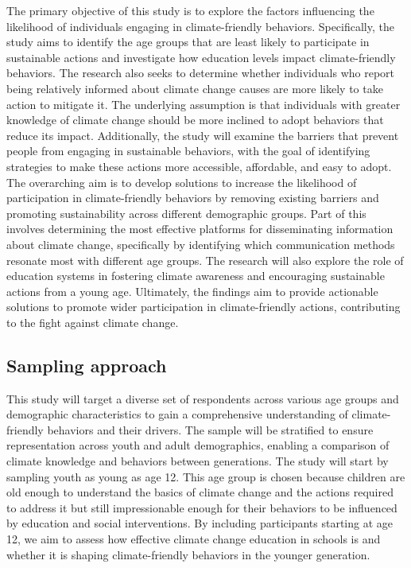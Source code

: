 \documentclass[
  letterpaper,
  DIV=11,
  numbers=noendperiod]{scrartcl}
\begin{document}
The primary objective of this study is to explore the factors
influencing the likelihood of individuals engaging in climate-friendly
behaviors. Specifically, the study aims to identify the age groups that
are least likely to participate in sustainable actions and investigate
how education levels impact climate-friendly behaviors. The research
also seeks to determine whether individuals who report being relatively
informed about climate change causes are more likely to take action to
mitigate it. The underlying assumption is that individuals with greater
knowledge of climate change should be more inclined to adopt behaviors
that reduce its impact. Additionally, the study will examine the
barriers that prevent people from engaging in sustainable behaviors,
with the goal of identifying strategies to make these actions more
accessible, affordable, and easy to adopt. The overarching aim is to
develop solutions to increase the likelihood of participation in
climate-friendly behaviors by removing existing barriers and promoting
sustainability across different demographic groups. Part of this
involves determining the most effective platforms for disseminating
information about climate change, specifically by identifying which
communication methods resonate most with different age groups. The
research will also explore the role of education systems in fostering
climate awareness and encouraging sustainable actions from a young age.
Ultimately, the findings aim to provide actionable solutions to promote
wider participation in climate-friendly actions, contributing to the
fight against climate change.

\subsection{Sampling approach}\label{sampling-approach}

This study will target a diverse set of respondents across various age
groups and demographic characteristics to gain a comprehensive
understanding of climate-friendly behaviors and their drivers. The
sample will be stratified to ensure representation across youth and
adult demographics, enabling a comparison of climate knowledge and
behaviors between generations. The study will start by sampling youth as
young as age 12. This age group is chosen because children are old
enough to understand the basics of climate change and the actions
required to address it but still impressionable enough for their
behaviors to be influenced by education and social interventions. By
including participants starting at age 12, we aim to assess how
effective climate change education in schools is and whether it is
shaping climate-friendly behaviors in the younger generation.
\end{document}
